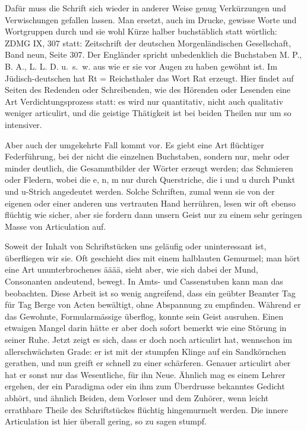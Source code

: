 Dafür muss die Schrift sich wieder in anderer Weise genug Verkürzungen und Verwischungen gefallen lassen. Man ersetzt, auch im Drucke, gewisse Worte und Wortgruppen durch  und  sie wohl Kürze halber buchstäblich statt wörtlich: ZDMG IX, 307 statt: Zeitschrift der deutschen Morgenländischen Gesellschaft, Band neun, Seite 307. Der Engländer spricht unbedenklich die Buchstaben M. P., \label{fp.412} B. A., L. L. D. u.~s.~w. aus wie er sie vor Augen zu haben gewöhnt ist. Im Jüdisch-deutschen hat Rt = Reichsthaler das Wort Rat erzeugt. Hier findet auf Seiten des Redenden oder Schreibenden, wie des Hörenden oder Lesenden eine Art Verdichtungsprozess statt: es wird nur quantitativ, nicht auch qualitativ weniger articulirt, und die geistige Thätigkeit ist bei beiden Theilen nur um so intensiver.

Aber auch der umgekehrte Fall kommt vor. Es giebt eine Art flüchtiger Federführung, bei der nicht die einzelnen Buchstaben, sondern nur, mehr oder minder deutlich, die Gesammtbilder der Wörter erzeugt werden; das Schmieren oder Fledern, wobei die e, n, m nur durch Querstriche, die i und u durch Punkt und u-Strich angedeutet werden. Solche Schriften, zumal wenn sie von der eigenen oder einer anderen uns vertrauten Hand herrühren, lesen wir oft ebenso flüchtig wie sicher, aber sie fordern dann unsern Geist nur zu einem sehr geringen Masse von Articulation auf.

Soweit der Inhalt von Schriftstücken uns geläufig oder uninteressant ist, überfliegen wir sie. Oft geschieht dies mit einem halblauten Gemurmel; man hört eine Art ununterbrochenes ääää, sieht aber, wie sich dabei der Mund, Consonanten andeutend, bewegt. In Amts- und Cassenstuben kann man das beobachten. Diese Arbeit ist so wenig angreifend, dass ein geübter Beamter Tag für Tag Berge von Acten bewältigt, ohne Abspannung zu empfinden. Während \label{sp.434} er das Gewohnte, Formularmässige überflog, konnte sein Geist ausruhen. Einen etwaigen Mangel darin hätte er aber doch sofort bemerkt wie eine Störung in seiner Ruhe. Jetzt zeigt es sich, dass er doch noch articulirt hat, wennschon im allerschwächsten Grade: er ist mit der stumpfen Klinge auf ein Sandkörnchen gerathen, und nun greift er schnell zu einer schärferen. Genauer articulirt aber hat er sonst nur das Wesentliche, für ihn Neue. Ähnlich mag es einem Lehrer ergehen, der ein Paradigma oder ein ihm zum Überdrusse bekanntes Gedicht abhört, und ähnlich Beiden, dem Vorleser und dem Zuhörer, wenn leicht errathbare Theile des Schriftstückes flüchtig hingemurmelt werden. Die innere Articulation ist hier überall gering, so zu sagen stumpf.

